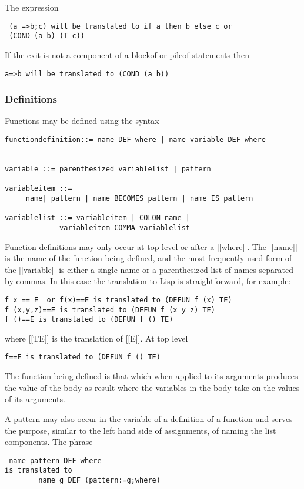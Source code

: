 \documentclass{article}
\begin{document}
The expression
\begin{verbatim}
 (a =>b;c) will be translated to if a then b else c or
 (COND (a b) (T c))
\end{verbatim}

If the exit is not a component of a blockof or pileof statements
then
\begin{verbatim}
a=>b will be translated to (COND (a b))
\end{verbatim}

\subsubsection{Definitions}

Functions may be defined using the syntax
\begin{verbatim}
functiondefinition::= name DEF where | name variable DEF where


variable ::= parenthesized variablelist | pattern

variableitem ::=
     name| pattern | name BECOMES pattern | name IS pattern

variablelist ::= variableitem | COLON name |
             variableitem COMMA variablelist
\end{verbatim}

Function definitions may only occur at top level or after a [[where]].
The [[name]] is the name of the function being defined, and the
most frequently used form of the [[variable]] is either a single name
or a parenthesized list of names separated by commas.
In this case the translation to Lisp is straightforward, for example:
\begin{verbatim}
f x == E  or f(x)==E is translated to (DEFUN f (x) TE)
f (x,y,z)==E is translated to (DEFUN f (x y z) TE)
f ()==E is translated to (DEFUN f () TE)
\end{verbatim}

where [[TE]] is the translation of [[E]].
At top level
\begin{verbatim}
f==E is translated to (DEFUN f () TE)
\end{verbatim}

The function being defined is that which when applied to its arguments
produces the value of the body as result where the variables
in the body take on the values of its arguments.

A pattern may also occur in the variable of a definition of a function
and serves the purpose, similar to the left hand side of assignments,
of naming the list components.
The phrase
\begin{verbatim}
 name pattern DEF where
is translated to
        name g DEF (pattern:=g;where)
\end{verbatim}
\end{document}
